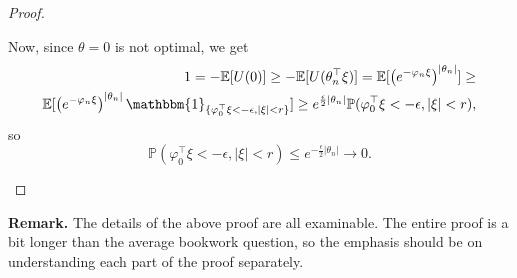 \documentclass{article}
\theoremstyle{definition}
\begin{document}
\begin{proof}
\begin{itemize}
        Now, since $\theta=0$ is not optimal, we get
        \begin{align*}
            1 = - \mathbb{E}[U(0)] \ge - \mathbb{E}[U(\theta_n^\top \xi)] = \mathbb{E}[\left(e^{-\varphi_n \xi}\right)^{|\theta_n|}] \ge \\
            \mathbb{E}[\left(e^{-\varphi_n \xi}\right)^{|\theta_n|} \mathbbm{1}_{\{\varphi_0^\top \xi < -\epsilon, |\xi|<r\}}] \ge e^{\frac{\epsilon}{2}|\theta_n|}\mathbb{P}(\varphi_0^\top \xi < -\epsilon, |\xi| < r),
        \end{align*}
        so \[
        \mathbb{P}(\varphi_0^\top \xi < -\epsilon, |\xi|<r) \le e^{-\frac{\epsilon}{2}|\theta_n|} \to 0.
        \]
    \end{itemize}
\end{proof}
\textbf{Remark.} The details of the above proof are all examinable. The entire proof is a bit longer than the average bookwork question, so the emphasis should be on understanding each part of the proof separately.
\end{document}
